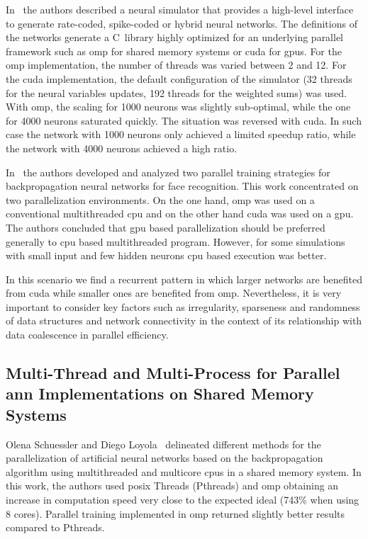 \documentclass[10pt,journal,compsoc]{IEEEtran}
\newcommand{\CC}{C\nolinebreak\hspace{-.05em}\raisebox{.4ex}{\tiny\bf +}\nolinebreak\hspace{-.10em}\raisebox{.4ex}{\tiny\bf +}}
\begin{document}
In~\cite{10.3389/fninf.2015.00019} the authors described a neural simulator that provides a high-level interface to generate rate-coded, spike-coded or hybrid neural networks. The definitions of the networks generate a \CC~library highly optimized for an underlying parallel framework such as \gls{omp} for shared memory systems or \gls{cuda} for \glspl{gpu}. For the \gls{omp} implementation, the number of threads was varied between 2 and 12. For the \gls{cuda} implementation, the default configuration of the simulator (32 threads for the neural variables updates, 192 threads for the weighted sums) was used. With \gls{omp}, the scaling for 1000 neurons was slightly sub-optimal, while the one for 4000 neurons saturated quickly. The situation was reversed with \gls{cuda}. In such case the network with 1000 neurons only achieved a limited speedup ratio, while the network with 4000 neurons achieved a high ratio.

In~\cite{HUQQANI2013349} the authors developed and analyzed two parallel training strategies for backpropagation neural networks for face recognition. This work concentrated on two parallelization environments. On the one hand, \gls{omp} was used on a conventional multithreaded \gls{cpu} and on the other hand \gls{cuda} was used on a \gls{gpu}. The authors concluded that \gls{gpu} based parallelization should be preferred generally to \gls{cpu} based multithreaded program. However, for some simulations with small input and few hidden neurons \gls{cpu} based execution was better.

In this scenario we find a recurrent pattern in which larger networks are benefited from \gls{cuda} while smaller ones are benefited from \gls{omp}. Nevertheless, it is very important to consider key factors such as irregularity, sparseness and randomness of data structures and network connectivity in the context of its relationship with data coalescence in parallel efficiency.











\subsection{Multi-Thread and Multi-Process for Parallel \gls{ann} Implementations on Shared Memory Systems}

Olena Schuessler and Diego Loyola~\cite{Schuessler:2011:PTA:1997052.1997062} delineated different methods for the parallelization of artificial neural networks based on the backpropagation algorithm using multithreaded and multicore \glspl{cpu} in a shared memory system. In this work, the authors used \gls{posix} Threads (Pthreads) and \gls{omp} obtaining an increase in computation speed very close to the expected ideal (743\% when using 8 cores). Parallel training implemented in \gls{omp} returned slightly better results compared to Pthreads.
\end{document}
